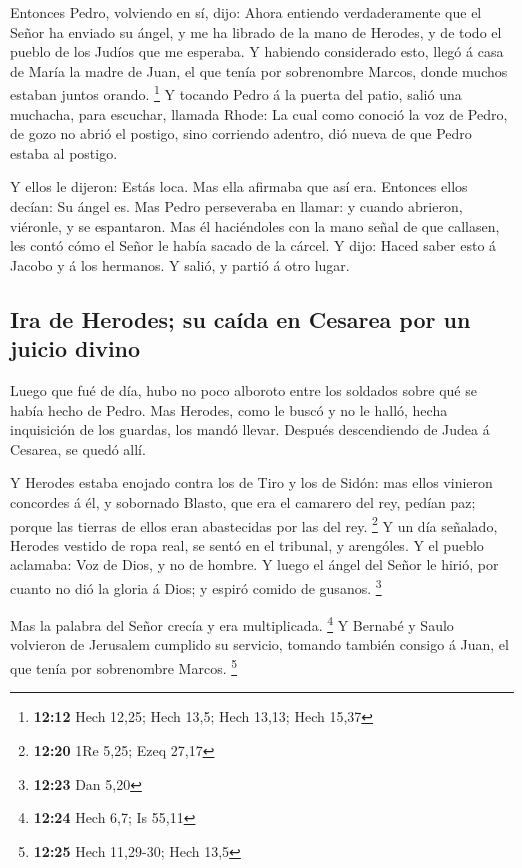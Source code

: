  Entonces Pedro, volviendo en sí, dijo: Ahora entiendo
verdaderamente que el Señor ha enviado su ángel, y me ha librado de la
mano de Herodes, y de todo el pueblo de los Judíos que me esperaba.
 Y habiendo considerado esto, llegó á casa de María la
madre de Juan, el que tenía por sobrenombre Marcos, donde muchos estaban
juntos orando. \footnote{\textbf{12:12} Hech 12,25; Hech 13,5; Hech
  13,13; Hech 15,37}  Y tocando Pedro á la puerta del
patio, salió una muchacha, para escuchar, llamada Rhode: 
La cual como conoció la voz de Pedro, de gozo no abrió el postigo, sino
corriendo adentro, dió nueva de que Pedro estaba al postigo.

 Y ellos le dijeron: Estás loca. Mas ella afirmaba que así
era. Entonces ellos decían: Su ángel es.  Mas Pedro
perseveraba en llamar: y cuando abrieron, viéronle, y se espantaron.
 Mas él haciéndoles con la mano señal de que callasen, les
contó cómo el Señor le había sacado de la cárcel. Y dijo: Haced saber
esto á Jacobo y á los hermanos. Y salió, y partió á otro lugar.

\hypertarget{ira-de-herodes-su-cauxedda-en-cesarea-por-un-juicio-divino}{%
\subsection{Ira de Herodes; su caída en Cesarea por un juicio
divino}\label{ira-de-herodes-su-cauxedda-en-cesarea-por-un-juicio-divino}}

 Luego que fué de día, hubo no poco alboroto entre los
soldados sobre qué se había hecho de Pedro.  Mas Herodes,
como le buscó y no le halló, hecha inquisición de los guardas, los mandó
llevar. Después descendiendo de Judea á Cesarea, se quedó allí.

 Y Herodes estaba enojado contra los de Tiro y los de
Sidón: mas ellos vinieron concordes á él, y sobornado Blasto, que era el
camarero del rey, pedían paz; porque las tierras de ellos eran
abastecidas por las del rey. \footnote{\textbf{12:20} 1Re 5,25; Ezeq
  27,17}  Y un día señalado, Herodes vestido de ropa real,
se sentó en el tribunal, y arengóles.  Y el pueblo
aclamaba: Voz de Dios, y no de hombre.  Y luego el ángel
del Señor le hirió, por cuanto no dió la gloria á Dios; y espiró comido
de gusanos. \footnote{\textbf{12:23} Dan 5,20}

 Mas la palabra del Señor crecía y era multiplicada.
\footnote{\textbf{12:24} Hech 6,7; Is 55,11}  Y Bernabé y
Saulo volvieron de Jerusalem cumplido su servicio, tomando también
consigo á Juan, el que tenía por sobrenombre Marcos. \footnote{\textbf{12:25}
  Hech 11,29-30; Hech 13,5}


